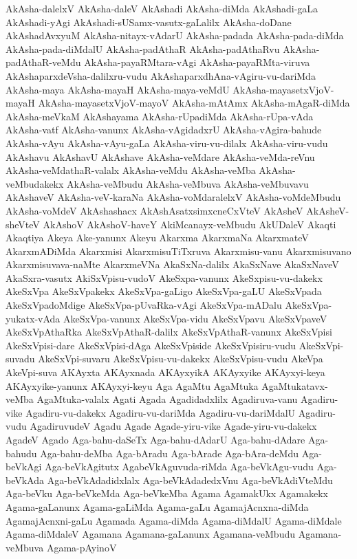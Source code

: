 {AkAsha-dalelxV
AkAsha-daleV
AkAshadi
AkAsha-diMda
AkAshadi-gaLa
AkAshadi-yAgi
AkAshadi-sUSamx-vasutx-gaLalilx
AkAsha-doDane
AkAshadAvxyuM
AkAsha-nitayx-vAdarU
AkAsha-padada
AkAsha-pada-diMda
AkAsha-pada-diMdalU
AkAsha-padAthaR
AkAsha-padAthaRvu
AkAsha-padAthaR-veMdu
AkAsha-payaRMtara-vAgi
AkAsha-payaRMta-viruva
AkAshaparxdeVsha-dalilxru-vudu
AkAshaparxdhAna-vAgiru-vu-dariMda
AkAsha-maya
AkAsha-mayaH
AkAsha-maya-veMdU
AkAsha-mayasetxVjoV-mayaH
AkAsha-mayasetxVjoV-mayoV
AkAsha-mAtAmx
AkAsha-mAgaR-diMda
AkAsha-meVkaM
AkAshayama
AkAsha-rUpadiMda
AkAsha-rUpa-vAda
AkAsha-vatf
AkAsha-vanunx
AkAsha-vAgidadxrU
AkAsha-vAgira-bahude
AkAsha-vAyu
AkAsha-vAyu-gaLa
AkAsha-viru-vu-dilalx
AkAsha-viru-vudu
AkAshavu
AkAshavU
AkAshave
AkAsha-veMdare
AkAsha-veMda-reVnu
AkAsha-veMdathaR-valalx
AkAsha-veMdu
AkAsha-veMba
AkAsha-veMbudakekx
AkAsha-veMbudu
AkAsha-veMbuva
AkAsha-veMbuvavu
AkAshaveV
AkAsha-veV-karaNa
AkAsha-voMdaralelxV
AkAsha-voMdeMbudu
AkAsha-voMdeV
AkAshashacx
AkAshAsatxsimxcneCxVteV
AkAsheV
AkAsheV-sheVteV
AkAshoV
AkAshoV-haveY
AkiMcanayx-veMbudu
AkUDaleV
Akaqti
Akaqtiya
Akeya
Ake-yanunx
Akeyu
Akarxma
AkarxmaNa
AkarxmateV
AkarxmADiMda
Akarxmisi
AkarxmisuTiTxruva
Akarxmisu-vanu
Akarxmisuvano
Akarxmisuvava-naMte
AkarxmeVNa
AkaSxNa-dalilx
AkaSxNave
AkaSxNaveV
AkaSxra-vasutx
AkiSxVpisu-vudoV
AkeSxpa-vanunx
AkeSxpisu-vu-dakekx
AkeSxVpa
AkeSxVpakekx
AkeSxVpa-gaLigo
AkeSxVpa-gaLU
AkeSxVpada
AkeSxVpadoMdige
AkeSxVpa-pUvaRka-vAgi
AkeSxVpa-mADalu
AkeSxVpa-yukatx-vAda
AkeSxVpa-vanunx
AkeSxVpa-vidu
AkeSxVpavu
AkeSxVpaveV
AkeSxVpAthaRka
AkeSxVpAthaR-dalilx
AkeSxVpAthaR-vanunx
AkeSxVpisi
AkeSxVpisi-dare
AkeSxVpisi-dAga
AkeSxVpiside
AkeSxVpisiru-vudu
AkeSxVpi-suvadu
AkeSxVpi-suvaru
AkeSxVpisu-vu-dakekx
AkeSxVpisu-vudu
AkeVpa
AkeVpi-suva
AKAyxta
AKAyxnada
AKAyxyikA
AKAyxyike
AKAyxyi-keya
AKAyxyike-yanunx
AKAyxyi-keyu
Aga
AgaMtu
AgaMtuka
AgaMtukatavx-veMba
AgaMtuka-valalx
Agati
Agada
Agadidadxlilx
Agadiruva-vanu
Agadiru-vike
Agadiru-vu-dakekx
Agadiru-vu-dariMda
Agadiru-vu-dariMdalU
Agadiru-vudu
AgadiruvudeV
Agadu
Agade
Agade-yiru-vike
Agade-yiru-vu-dakekx
AgadeV
Agado
Aga-bahu-daSeTx
Aga-bahu-dAdarU
Aga-bahu-dAdare
Aga-bahudu
Aga-bahu-deMba
Aga-bAradu
Aga-bArade
Aga-bAra-deMdu
Aga-beVkAgi
Aga-beVkAgitutx
AgabeVkAguvuda-riMda
Aga-beVkAgu-vudu
Aga-beVkAda
Aga-beVkAdadidxlalx
Aga-beVkAdadedxVnu
Aga-beVkAdiVteMdu
Aga-beVku
Aga-beVkeMda
Aga-beVkeMba
Agama
AgamakUkx
Agamakekx
Agama-gaLanunx
Agama-gaLiMda
Agama-gaLu
AgamajAcnxna-diMda
AgamajAcnxni-gaLu
Agamada
Agama-diMda
Agama-diMdalU
Agama-diMdale
Agama-diMdaleV
Agamana
Agamana-gaLanunx
Agamana-veMbudu
Agamana-veMbuva
Agama-pAyinoV
}
